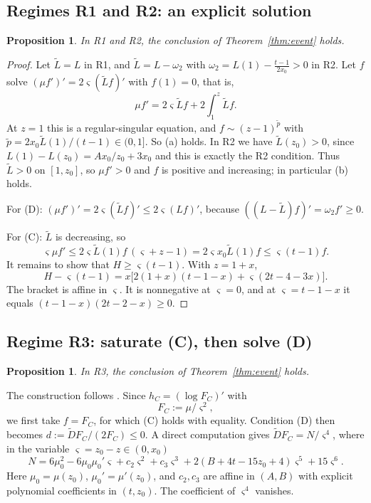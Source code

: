\documentclass[11pt]{amsart}
\newtheorem{proposition}[theorem]{Proposition}
\theoremstyle{definition}
\theoremstyle{remark}
\numberwithin{equation}{section}
\begin{document}
\subsection{Regimes R1 and R2: an explicit solution}
\begin{proposition}\label{prop:R12}
In R1 and R2, the conclusion of Theorem~\ref{thm:event} holds.
\end{proposition}
\begin{proof}
Let $\tilde L=L$ in R1, and $\tilde L=L-\omega_2$ with $\omega_2=L(1)-\frac{t-1}{2x_0}>0$ in R2. Let $f$ solve
$(\mu f')'=2\varsigma(\tilde Lf)'$ with $f(1)=0$, that is,
\[
\mu f'=2\varsigma\tilde Lf+2\int_1^z\tilde Lf.
\]
At $z=1$ this is a regular-singular equation, and $f\sim(z-1)^{\tilde p}$ with
$\tilde p=2x_0\tilde L(1)/(t-1)\in(0,1]$. So (a) holds. In R2 we have $\tilde L(z_0)>0$, since
$L(1)-L(z_0)=Ax_0/z_0+3x_0$ and this is exactly the R2 condition. Thus $\tilde L>0$ on $[1,z_0]$, so $\mu f'>0$ and
$f$ is positive and increasing; in particular (b) holds.

For (D): $(\mu f')'=2\varsigma(\tilde Lf)'\le2\varsigma(Lf)'$, because $((L-\tilde L)f)'=\omega_2 f'\ge0$.

For (C): $\tilde L$ is decreasing, so
\[
\varsigma\mu f'\le2\varsigma\tilde L(1)f\,(\varsigma+z-1)=2\varsigma x_0\tilde L(1)f\le \varsigma(t-1)f.
\]
It remains to show that $H\ge \varsigma(t-1)$. With $z=1+x$,
\[
H-\varsigma(t-1)=x\big[2(1+x)(t-1-x)+\varsigma(2t-4-3x)\big].
\]
The bracket is affine in $\varsigma$. It is nonnegative at $\varsigma=0$, and at $\varsigma=t-1-x$ it equals $(t-1-x)(2t-2-x)\ge0$.
\end{proof}

\subsection{Regime R3: saturate (C), then solve (D)}
\begin{proposition}\label{prop:R3}
In R3, the conclusion of Theorem~\ref{thm:event} holds.
\end{proposition}

The construction follows \cite[\S4.3.3]{Hin26}. Since $h_C=(\log F_C)'$ with
\[
F_C:=\mu/\varsigma^2,
\]
we first take $f=F_C$, for which (C) holds with equality. Condition (D) then becomes
$d:=\widetilde DF_C/(2F_C)\le0$. A direct computation gives $\widetilde DF_C=N/\varsigma^4$, where in the variable
$\varsigma=z_0-z\in(0,x_0)$
\begin{equation}\label{eq:N}
N=6\mu_0^2-6\mu_0\mu_0'\varsigma+c_2\varsigma^2+c_3\varsigma^3+2(B+4t-15z_0+4)\varsigma^5+15\varsigma^6.
\end{equation}
Here $\mu_0=\mu(z_0)$, $\mu_0'=\mu'(z_0)$, and $c_2,c_3$ are affine in $(A,B)$ with explicit polynomial
coefficients in $(t,z_0)$. The coefficient of $\varsigma^4$ vanishes.
\end{document}
